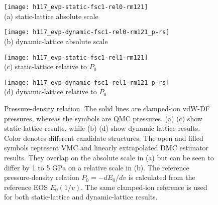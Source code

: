 \begin{figure}[h]
\centering
\begin{minipage}{0.49\textwidth}
\centering
\texttt{[image: h117\_evp-static-fsc1-rel0-rm121]}\\
(a) static-lattice absolute scale
\end{minipage}
\begin{minipage}{0.49\textwidth}
\centering
\texttt{[image: h117\_evp-dynamic-fsc1-rel0-rm121\_p-rs]}\\
(b) dynamic-lattice absolute scale
\end{minipage}
\begin{minipage}{0.49\textwidth}
\centering
\texttt{[image: h117\_evp-static-fsc1-rel1-rm121]}\\
(c) static-lattice relative to $P_0$
\end{minipage}
\begin{minipage}{0.49\textwidth}
\centering
\texttt{[image: h117\_evp-dynamic-fsc1-rel1-rm121\_p-rs]}\\
(d) dynamic-lattice relative to $P_0$
\end{minipage}
\caption{Pressure-density relation. The solid lines are clamped-ion vdW-DF pressures, whereas the symbols are QMC pressures. (a) (c) show static-lattice results, while (b) (d) show dynamic lattice results. Color denotes different candidate structures. The open and filled symbols represent VMC and linearly extrapolated DMC estimator results. They overlap on the absolute scale in (a) but can be seen to differ by 1 to 5 GPa on a relative scale in (b). The reference pressure-density relation $P_0=-dE_0/dv$ is calculated from the reference EOS $E_0(1/v)$. The same clamped-ion reference is used for both static-lattice and dynamic-lattice results.}
\label{fig:hsolid-p-vs-n}
\end{figure}

